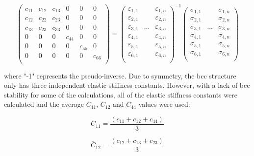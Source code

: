 \begin{equation}
\label{eq: hookes}
\begin{pmatrix}
	c_{11} & c_{12} & c_{13} & 0 & 0 & 0\\
	c_{12} & c_{22} & c_{23} & 0 & 0 & 0\\
	c_{13} & c_{23} & c_{33} & 0 & 0 & 0\\
	0 & 0 & 0 & c_{44} & 0 & 0\\
	0 & 0 & 0 & 0 &  c_{55} & 0\\
	0 & 0 & 0 & 0 & 0 & c_{66} \\    		
\end{pmatrix} =
\begin{pmatrix}
	\varepsilon_{1,1} & & \varepsilon_{1,n}\\
	\varepsilon_{2,1} & & \varepsilon_{2,n}\\
	\varepsilon_{3,1} & ... & \varepsilon_{3,n}\\
	\varepsilon_{4,1} & & \varepsilon_{4,n}\\
	\varepsilon_{5,1} & & \varepsilon_{5,n}\\
	\varepsilon_{6,1} & & \varepsilon_{6,n}\\					
\end{pmatrix}^{-1}
\begin{pmatrix}
	\sigma_{1,1} & & \sigma_{1,n}\\
	\sigma_{2,1} & & \sigma_{2,n}\\
	\sigma_{3,1} & ... & \sigma_{3,n}\\
	\sigma_{4,1} & & \sigma_{4,n}\\
	\sigma_{5,1} & & \sigma_{5,n}\\
	\sigma_{6,1} & & \sigma_{6,n}\\					
\end{pmatrix}
\end{equation}

\noindent where "-1" represents the pseudo-inverse. Due to symmetry, the bcc structure only has three independent elastic stiffness constants. However, with a lack of bcc stability for some of the calculations, all of the elastic stiffness constants were calculated and the average $\overline{C}_{11}$, $\overline{C}_{12}$ and $\overline{C}_{44}$ values were used:

\begin{equation}
\label{eq: averagec11}
\overline{C}_{11} = \frac{(c_{11} + c_{12} + c_{44})}{3}
\end{equation}

\begin{equation}
\label{eq: averagec12}
\overline{C}_{12} = \frac{(c_{12} + c_{13} + c_{23})}{3}
\end{equation}

